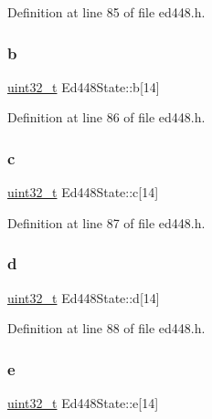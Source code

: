 Definition at line 85 of file ed448.\+h.

\mbox{\label{structEd448State_a5b53562eef4d3b0b81a24f016aa99bc4}} 
\subsubsection{\texorpdfstring{b}{b}}
{\footnotesize\ttfamily \hyperlink{stdint_8h_a435d1572bf3f880d55459d9805097f62}{uint32\+\_\+t} Ed448\+State\+::b\mbox{[}14\mbox{]}}



Definition at line 86 of file ed448.\+h.

\mbox{\label{structEd448State_a78d0f1209633c367017d8d461c4b6e84}} 
\subsubsection{\texorpdfstring{c}{c}}
{\footnotesize\ttfamily \hyperlink{stdint_8h_a435d1572bf3f880d55459d9805097f62}{uint32\+\_\+t} Ed448\+State\+::c\mbox{[}14\mbox{]}}



Definition at line 87 of file ed448.\+h.

\mbox{\label{structEd448State_a3f052b03dccc728fdff2d62927a9a59f}} 
\subsubsection{\texorpdfstring{d}{d}}
{\footnotesize\ttfamily \hyperlink{stdint_8h_a435d1572bf3f880d55459d9805097f62}{uint32\+\_\+t} Ed448\+State\+::d\mbox{[}14\mbox{]}}



Definition at line 88 of file ed448.\+h.

\mbox{\label{structEd448State_a62cda869b3e678db6b13553921f82f29}} 
\subsubsection{\texorpdfstring{e}{e}}
{\footnotesize\ttfamily \hyperlink{stdint_8h_a435d1572bf3f880d55459d9805097f62}{uint32\+\_\+t} Ed448\+State\+::e\mbox{[}14\mbox{]}}



